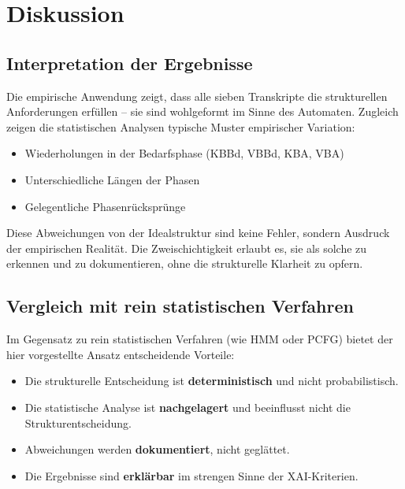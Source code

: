 \documentclass[
  12pt,
  a4paper,
  oneside,
  titlepage
]{article}
\begin{document}
\section{Diskussion}

\subsection{Interpretation der Ergebnisse}

Die empirische Anwendung zeigt, dass alle sieben Transkripte die 
strukturellen Anforderungen erfüllen – sie sind wohlgeformt im Sinne 
des Automaten. Zugleich zeigen die statistischen Analysen typische 
Muster empirischer Variation:

\begin{itemize}
    \item Wiederholungen in der Bedarfsphase (KBBd, VBBd, KBA, VBA)
    \item Unterschiedliche Längen der Phasen
    \item Gelegentliche Phasenrücksprünge
\end{itemize}

Diese Abweichungen von der Idealstruktur sind keine Fehler, sondern 
Ausdruck der empirischen Realität. Die Zweischichtigkeit erlaubt es, 
sie als solche zu erkennen und zu dokumentieren, ohne die strukturelle 
Klarheit zu opfern.

\subsection{Vergleich mit rein statistischen Verfahren}

Im Gegensatz zu rein statistischen Verfahren (wie HMM oder PCFG) 
bietet der hier vorgestellte Ansatz entscheidende Vorteile:

\begin{itemize}
    \item Die strukturelle Entscheidung ist \textbf{deterministisch} 
    und nicht probabilistisch.
    
    \item Die statistische Analyse ist \textbf{nachgelagert} und 
    beeinflusst nicht die Strukturentscheidung.
    
    \item Abweichungen werden \textbf{dokumentiert}, nicht geglättet.
    
    \item Die Ergebnisse sind \textbf{erklärbar} im strengen Sinne 
    der XAI-Kriterien.
\end{itemize}
\end{document}
